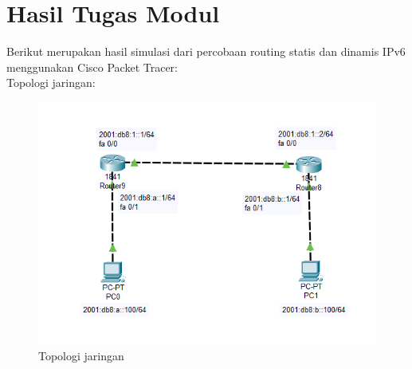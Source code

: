 \section{Hasil Tugas Modul}
Berikut merupakan hasil simulasi dari percobaan routing statis dan dinamis IPv6 menggunakan Cisco Packet Tracer:\\
Topologi jaringan:
\begin{figure}[H]
	\centering
	\includegraphics{P2/img/tumod (6).png}
	\caption{Topologi jaringan \label{fig:topologi}}
\end{figure}

